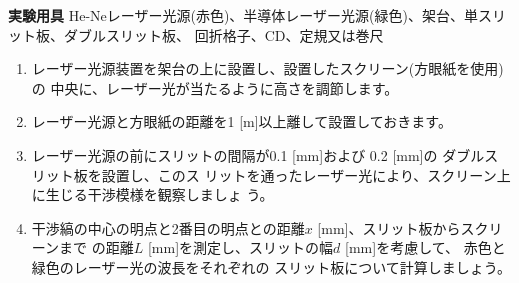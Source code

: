 \newpage

\jikken

\begin{itemsquarebox}[c]{\bf 実験用具}
He-Neレーザー光源(赤色)、半導体レーザー光源(緑色)、架台、単スリット板、ダブルスリット板、
回折格子、CD、定規又は巻尺
\end{itemsquarebox}

\bigskip


%
%
%
%
%


\begin{enumerate}

\item レーザー光源装置を架台の上に設置し、設置したスクリーン(方眼紙を使用)の
中央に、レーザー光が当たるように高さを調節します。

\item レーザー光源と方眼紙の距離を1 [m]以上離して設置しておきます。

\item レーザー光源の前にスリットの間隔が0.1 [mm]および
0.2 [mm]の ダブルスリット板を設置し、このス
リットを通ったレーザー光により、スクリーン上に生じる干渉模様を観察しましょ
う。

\item 干渉縞の中心の明点と2番目の明点との距離$x$ [mm]、スリット板からスクリーンまで
の距離$L$ [mm]を測定し、スリットの幅$d$ [mm]を考慮して、
赤色と緑色のレーザー光の波長をそれぞれの
スリット板について計算しましょう。


\end{enumerate}



